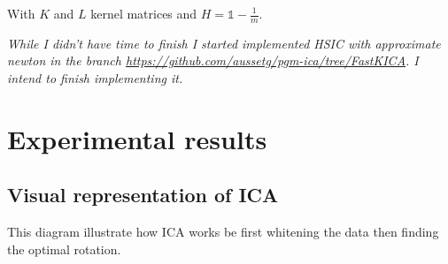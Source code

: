 \documentclass[a4paper,BCOR=5mm,oneside,openany]{scrreprt}
\begin{document}
With $K$ and $L$ kernel matrices and $H = \mathds{1} - \frac{1}{m}$.

\vspace{1cm}

\emph{While I didn't have time to finish I started implemented HSIC with approximate newton in the branch \url{https://github.com/aussetg/pgm-ica/tree/FastKICA}. I intend to finish implementing it.}

\appendix

\chapter{Experimental results}

\section{Visual representation of ICA}

This diagram illustrate how ICA works be first whitening the data then finding the optimal rotation.

\begin{figure}[H]
	\centering
	\hfill
	 \\
	\vfill
	\hfill
\end{figure}
\end{document}
